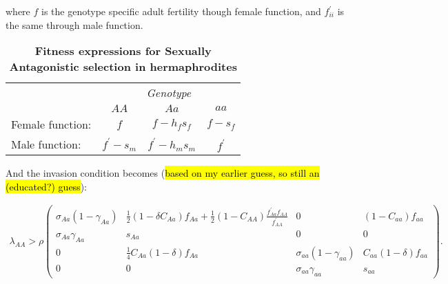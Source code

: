 \documentclass[11pt]{article}
\begin{document}
\noindent where $f$ is the genotype specific adult fertility though female function, and $f^{\prime}_{ii}$ is the same through male function. 
\begin{table}[htbp]
 \centering
 \caption{\bf Fitness expressions for Sexually Antagonistic selection in hermaphrodites}
\begin{tabular}{lccc}
 \toprule
					&  \multicolumn{3}{c}{{\textit{Genotype}}} \\ 
\cline{2-4}
					& $AA$			& $Aa$ 					& $aa$ 		\\ \hline
Female function:	& $f$		& $f - h_f s_f$	& $f - s_f$ \\	
Male function:		& $f^\prime - s_m$& $f^\prime - h_m s_m$	& $f^\prime$ 		\\	
\hline
\end{tabular}
\end{table}

And the invasion condition becomes (\hl{based on my earlier guess, so still an (educated?) guess}):

\begin{eqnarray} \label{eq:coexist_AA}
\lambda_{AA}> 
			\rho\left(
					\begin{array}{cc|cc}
						\sigma_{Aa}(1 - \gamma_{Aa}) &  \frac{1}{2} (1 - \delta C_{Aa}) f_{Aa} +\frac{1}{2} (1 - C_{AA})\frac{f^\prime_{Aa}f_{AA}}{f^\prime_{AA}} &0 & (1-C_{aa})f_{aa}\\
						\sigma_{Aa} \gamma_{Aa}     & s_{Aa}& 0 & 0\\ \hline
							0 & \frac{1}{4}C_{Aa}(1-\delta)f_{Aa} &\sigma_{aa}(1 - \gamma_{aa})  & C_{aa}(1-\delta)f_{aa}\\
								0 & 0 & \sigma_{aa} \gamma_{aa}     & s_{aa}
					\end{array}
				\right). 
\end{eqnarray} 
\end{document}

